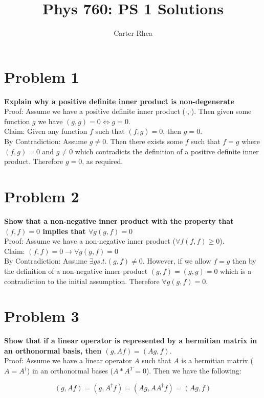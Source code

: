 \documentclass[10pt,a4paper]{article}
\author{Carter Rhea}
\title{Phys 760: PS 1 Solutions}
\begin{document}
	\maketitle
	\section{Problem 1}
	\textbf{Explain why a positive definite inner product is non-degenerate}\\
	Proof: Assume we have a positive definite inner product ($\cdot$,$\cdot$). Then given some function $g$ we have $(g,g) = 0 \Leftrightarrow g = 0$.\\
	Claim: Given any function $f$ such that $(f,g) = 0$, then $g=0$.\\
	By Contradiction: Assume $g \neq 0$. Then there exists some $f$ such that $f=g$ where $(f,g)=0$ and $g\neq0$ which contradicts the definition of a positive definite inner product. Therefore $g=0$, as required.
	
	\section{Problem 2}
	\textbf{Show that a non-negative inner product with the property that $(f,f)=0$ implies that $\forall g (g,f) = 0$}\\
	Proof: Assume we have a non-negative inner product ($\forall f (f,f) \geq 0$).\\
	Claim: $(f,f)=0 \rightarrow \forall g (g,f)=0$\\
	By Contradiction: Assume $\exists g s.t. (g,f)\neq 0$. However, if we allow $f=g$ then by the definition of a non-negative inner product $(g,f) = (g,g) = 0$ which is a contradiction to the initial assumption. Therefore $\forall g (g,f)=0$.
	
	\section{Problem 3}
	\textbf{Show that if a linear operator is represented by a hermitian matrix in an orthonormal basis, then $(g,Af)=(Ag,f)$}.\\
	Proof: Assume we have a linear operator $A$ such that $A$ is a hermitian matrix ($A=A^\dagger$) in an orthonormal bases ($A*A^T=0$). Then we have the following:

		$$(g,Af) = (g,A^\dagger f) = (Ag,AA^\dagger f) = (Ag,f)$$
\end{document}
